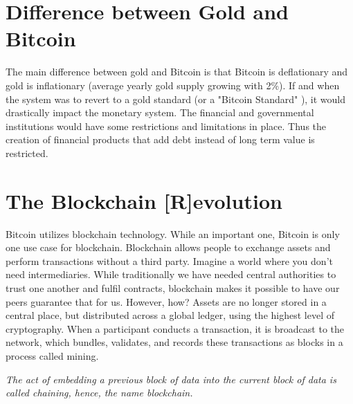 \section*{Difference between Gold and Bitcoin}
The main difference between gold and Bitcoin is that Bitcoin is deflationary and gold is inflationary (average yearly gold supply growing with 2\%). If and when the system was to revert to a gold standard (or a "Bitcoin Standard" \parencite{bitcoinstandard}), it would drastically impact the monetary system. The financial and governmental institutions would have some restrictions and limitations in place. Thus the creation of financial products that add debt instead of long term value is restricted.


\section{The Blockchain [R]evolution}
Bitcoin utilizes blockchain technology. While an important one, Bitcoin is only one use case for blockchain. Blockchain allows people to exchange assets and perform transactions without a third party. Imagine a world where you don't need intermediaries. While traditionally we have needed central authorities to trust one another and fulfil contracts, blockchain makes it possible to have our peers guarantee that for us. However, how?
Assets are no longer stored in a central place, but distributed across a global ledger, using the highest level of cryptography. When a participant conducts a transaction, it is broadcast to the network, which bundles, validates, and records these transactions as blocks in a process called mining.

\medskip 
{}
    \begin{tcolorbox}
    [enhanced,
    title=Blockchain?,
    frame style=
    {left color=orange!85!black,right color=yellow!95!black}]
        
           \textit{The act of embedding a previous block of data into the current block of data is called chaining, hence, the name blockchain.}
       
\end{tcolorbox}
\medskip


